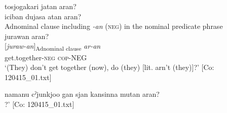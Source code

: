 \ex \label{ex:9.57d} %
 \glll  {\textbar}tosjogakari{\textbar}  jatan  aran?\\
      [\textit{tasjogakari}  {\textit{jar-tar-n}]\textsubscript{Adnominal clause}}  \textit{ar-an}\\
      librarian  \textsc{cop}-\textsc{pst}-\textsc{ptcp}  COP-\textsc{neg}\\
      \glt       ‘(Your father) was a librarian, wasn’t he?’ [Co: 120415\_01.txt]

\ex \label{ex:9.57e} %
 \glll  {\textbar}iciban{\textbar}  dujasa  atan  aran?\\
      [\textit{iciban}  \textit{duja-sa}  {\textit{ar-tar-n}]\textsubscript{Adnominal clause}}  \textit{ar-an}\\
      most  rich-\textsc{adj}  \textsc{stv}-\textsc{pst}-\textsc{ptcp}  \textsc{cop}-\textsc{neg}\\
      \glt       ‘(Your grandfather) was the most rich, isn’t (he)?’ [Co: 120415\_01.txt]

\exi{}  Adnominal clause including \textit{-an} (\textsc{neg}) in the nominal predicate phrase
\ex{}\\
    \glll  jurawan  aran?\\
      {[\textit{juraw-an}]\textsubscript{Adnominal clause}}  \textit{ar-an}\\
      get.together-\textsc{neg}  \textsc{cop}-NEG\\
      \glt       ‘(They) don’t get together (now), do (they) [lit. arn’t (they)]?’ [Co: 120415\_01.txt]

\ex  %
     \glll namanu  cˀjunkjoo  gan  sjan  {\textbar}kansin{\textbar}na  mutan  aran?\\
      [\textit{nama=nu}  \textit{cˀju=nkja=ja}  \textit{ga-n}  \textit{sɨr-tar-n} \textit{kansin=ja}  {\textit{mut-an}]\textsubscript{Adnominal clause}}  \textit{ar-an}\\
      now=\textsc{gen}  person=\textsc{appr}=\textsc{top}  \textsc{mes}-\textsc{advz}  do-\textsc{pst}-\textsc{ptcp}  interest=TOP  have-\textsc{neg}  \textsc{cop}-NEG\\
      \glt ‘The people in these days don’t have such a kind of interest, do (they) [lit. aren’t (they)]?’     [Co: 120415\_01.txt]
    \z
\z

